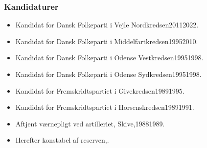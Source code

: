 \documentclass[11pt, a4paper]{awesome-cv}
\begin{document}
\begin{cvletter}
\subsubsection*{Kandidaturer}
\begin{itemize}
\item Kandidat for Dansk Folkeparti i Vejle Nordkredsen20112022.
\item Kandidat for Dansk Folkeparti i Middelfartkredsen19952010.
\item Kandidat for Dansk Folkeparti i Odense Vestkredsen19951998.
\item Kandidat for Dansk Folkeparti i Odense Sydkredsen19951998.
\item Kandidat for Fremskridtspartiet i Givekredsen19891995.
\item Kandidat for Fremskridtspartiet i Horsenskredsen19891991.
\end{itemize}
\begin{itemize}
\item Aftjent værnepligt ved artilleriet, Skive,19881989.
\item Herefter konstabel af reserven,.
\end{itemize}
\end{cvletter}
\end{document}
